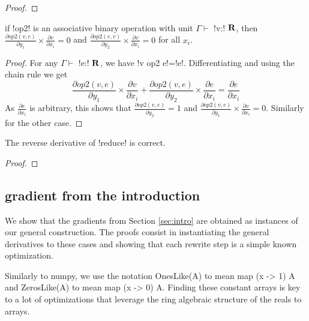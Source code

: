 \begin{proof}
    
\end{proof}

\begin{lemma}
    if !op2! is an associative binary operation with unit $\Gamma \vdash$ !v:! $\mathbf{R}$, then 
    $\frac{\partial op2(v,e)}{\partial y_1}\times\frac{\partial v}{\partial x_i}=0$ 
    and $\frac{\partial op2(e,v)}{\partial y_2}\times\frac{\partial v}{\partial x_i}=0$ for all $x_i$.
\end{lemma}

\begin{proof}
    For any $\Gamma \vdash$ !e:! $\mathbf{R}$, we have !v op2 e!=!e!.
    Differentiating and using the chain rule we get 
    $$\frac{\partial op2(v,e)}{\partial y_1}\times\frac{\partial v}{\partial x_i}
    +\frac{\partial op2(v,e)}{\partial y_2}\times\frac{\partial e}{\partial x_i}
    = \frac{\partial e}{\partial x_i}$$
As $\frac{\partial e}{\partial x_i}$ is arbitrary, 
this shows that $\frac{\partial op2(v,e)}{\partial y_2}=1$ and $\frac{\partial op2(v,e)}{\partial y_1}\times\frac{\partial v}{\partial x_i}=0$.
Similarly for the other case.
\end{proof}

\begin{proposition}
    The reverse derivative of !reduce! is correct.
\end{proposition}

\begin{proof}
    
\end{proof}

\subsection{gradient from the introduction}
\label{sub:gradintro}

We show that the gradients from Section \ref{sec:intro} are obtained as instances of our general construction. 
The proofs consist in instantiating the general derivatives to these cases 
and showing that each rewrite step is a simple known optimization.

Similarly to numpy, we use the notation OnesLike(A) to mean map (x -> 1) A 
and ZerosLike(A) to mean map (x -> 0) A. 
Finding these constant arrays is key to a lot of optimizations that leverage the ring algebraic structure of the reals to arrays.


